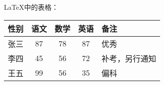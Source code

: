 \documentclass{ctexart}
\begin{document}
	\LaTeX{}中的表格：
	\begin{tabular}{|l|| c| c| c| p{2cm}|} %
	\hline
	性别 & 语文 & 数学 & 英语 & 备注\\
	\hline \hline
	张三 & 87 & 78 & 87& 优秀\\
	\hline
	李四 & 45 & 56 & 72 & 补考，另行通知\\
	\hline
	王五 & 99 & 56 & 35 & 偏科\\
	\hline
	\end{tabular}
\end{document}
